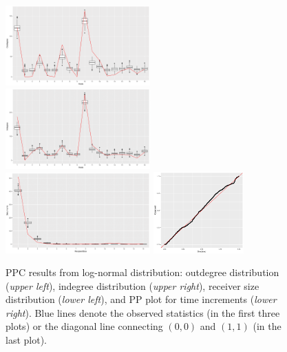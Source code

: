 \documentclass[ba]{imsart}
\numberwithin{equation}{section}
\theoremstyle{plain}
\begin{document}
	\begin{figure}[!t]
		\centering
		\includegraphics[width=0.495\textwidth]{img/outdegreenew-1.png}	
		\includegraphics[width=0.495\textwidth]{img/indegreenew-1.png}	
		\includegraphics[width=0.495\textwidth]{img/recipientsizenew-1.png}	
		\includegraphics[width=0.31\textwidth]{img/timeppnew.pdf}
		\caption {PPC results from log-normal distribution: outdegree distribution (\textit{upper left}), indegree distribution (\textit{upper right}), receiver size distribution (\textit{lower left}), and PP plot for time increments (\textit{lower right}). Blue lines denote the observed statistics (in the first three plots) or the diagonal line connecting $(0, 0)$ and $(1, 1)$ (in the last plot).}
		\label{figure:PPCresults}
	\end{figure}
	
\end{document}

